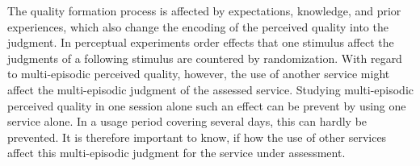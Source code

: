 The quality formation process is affected by expectations, knowledge, and prior experiences, which also change the encoding of the perceived quality into the judgment.
In perceptual experiments order effects that one stimulus affect the judgments of a following stimulus are countered by randomization.
With regard to multi-episodic perceived quality, however, the use of another service might affect the multi-episodic judgment of the assessed service.
Studying multi-episodic perceived quality in one session alone such an effect can be prevent by using one service alone.
In a usage period covering several days, this can hardly be prevented.
It is therefore important to know, if how the use of other services affect this multi-episodic judgment for the service under assessment.



